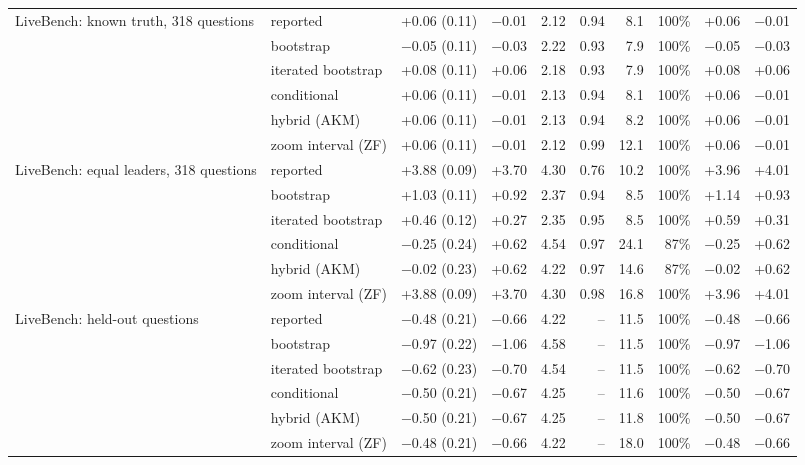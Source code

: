 \begin{tabular}{llrrrrrrrr}
\addlinespace
LiveBench: known truth, 318 questions & reported & +0.06 (0.11) & $-$0.01 & 2.12 & 0.94 & 8.1 & 100\% & +0.06 & $-$0.01 \\
 & bootstrap & $-$0.05 (0.11) & $-$0.03 & 2.22 & 0.93 & 7.9 & 100\% & $-$0.05 & $-$0.03 \\
 & iterated bootstrap & +0.08 (0.11) & +0.06 & 2.18 & 0.93 & 7.9 & 100\% & +0.08 & +0.06 \\
 & conditional & +0.06 (0.11) & $-$0.01 & 2.13 & 0.94 & 8.1 & 100\% & +0.06 & $-$0.01 \\
 & hybrid (AKM) & +0.06 (0.11) & $-$0.01 & 2.13 & 0.94 & 8.2 & 100\% & +0.06 & $-$0.01 \\
 & zoom interval (ZF) & +0.06 (0.11) & $-$0.01 & 2.12 & 0.99 & 12.1 & 100\% & +0.06 & $-$0.01 \\
\addlinespace
LiveBench: equal leaders, 318 questions & reported & +3.88 (0.09) & +3.70 & 4.30 & 0.76 & 10.2 & 100\% & +3.96 & +4.01 \\
 & bootstrap & +1.03 (0.11) & +0.92 & 2.37 & 0.94 & 8.5 & 100\% & +1.14 & +0.93 \\
 & iterated bootstrap & +0.46 (0.12) & +0.27 & 2.35 & 0.95 & 8.5 & 100\% & +0.59 & +0.31 \\
 & conditional & $-$0.25 (0.24) & +0.62 & 4.54 & 0.97 & 24.1 & 87\% & $-$0.25 & +0.62 \\
 & hybrid (AKM) & $-$0.02 (0.23) & +0.62 & 4.22 & 0.97 & 14.6 & 87\% & $-$0.02 & +0.62 \\
 & zoom interval (ZF) & +3.88 (0.09) & +3.70 & 4.30 & 0.98 & 16.8 & 100\% & +3.96 & +4.01 \\
\addlinespace
LiveBench: held-out questions & reported & $-$0.48 (0.21) & $-$0.66 & 4.22 & -- & 11.5 & 100\% & $-$0.48 & $-$0.66 \\
 & bootstrap & $-$0.97 (0.22) & $-$1.06 & 4.58 & -- & 11.5 & 100\% & $-$0.97 & $-$1.06 \\
 & iterated bootstrap & $-$0.62 (0.23) & $-$0.70 & 4.54 & -- & 11.5 & 100\% & $-$0.62 & $-$0.70 \\
 & conditional & $-$0.50 (0.21) & $-$0.67 & 4.25 & -- & 11.6 & 100\% & $-$0.50 & $-$0.67 \\
 & hybrid (AKM) & $-$0.50 (0.21) & $-$0.67 & 4.25 & -- & 11.8 & 100\% & $-$0.50 & $-$0.67 \\
 & zoom interval (ZF) & $-$0.48 (0.21) & $-$0.66 & 4.22 & -- & 18.0 & 100\% & $-$0.48 & $-$0.66 \\
\bottomrule
\end{tabular}
